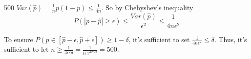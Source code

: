 \documentclass[11pt,preview]{standalone} %
\begin{document}
\begin{enumerate}
\begin{Freeform}{500}
\Solution $Var(\hat{p}) = \frac{1}{n} p(1-p) \leq \frac{1}{4n} $. So by Chebyshev's inequality
$$P(|p - \hat{p}| \geq \epsilon) \leq \frac{Var(\hat{p})}{\epsilon^2} \leq \frac{1}{4n\epsilon^2}$$

To ensure $P(p \in [\hat{p} - \epsilon, \hat{p} + \epsilon]) \geq 1 - \delta$, it's sufficient to set $\frac{1}{4n\epsilon^2} \leq \delta$. Thus, it's sufficient to let $n \geq \frac{1}{4\epsilon^2\delta} = \frac{1}{0.1^20.05} = 500$.
\end{Freeform}




\end{enumerate}
\end{document}
